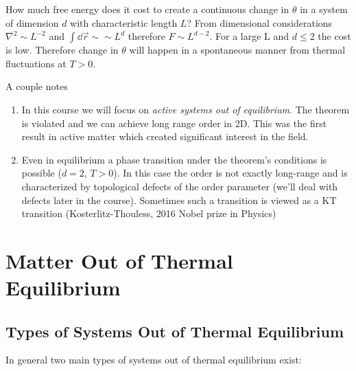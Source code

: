 How much free energy does it cost to create a continuous change in $\theta$ in a system of dimension $d$ with characteristic length $L$? From dimensional considerations $\nabla^2 \sim L^{-2}$ and $\int\dd \vec r \sim \sim L^d$ therefore $F\sim L^{d-2}$. For a large L and $d\leq 2$ the cost is low. Therefore change in $\theta$ will happen in a spontaneous manner from thermal 	fluctuations at $T>0$.

A couple notes

\begin{enumerate}
	\item In this course we will focus on \emph{active systems out of equilibrium}. The theorem is violated and we can achieve long range order in 2D. This was the first result in active matter which created significant interest in the field.
	\item Even in equilibrium a phase transition under the theorem's conditions is possible ($d=2$, $T>0$). In this case the order is not exactly long-range and is characterized by topological defects of the order parameter (we'll deal with defects later in the course). Sometimes such a transition is viewed as a KT transition (Kosterlitz-Thouless, 2016 Nobel prize in Physics)
\end{enumerate}

\clearpage
\section{Matter Out of Thermal Equilibrium}

\subsection{Types of Systems Out of Thermal Equilibrium}

In general two main types of systems out of thermal equilibrium exist:

